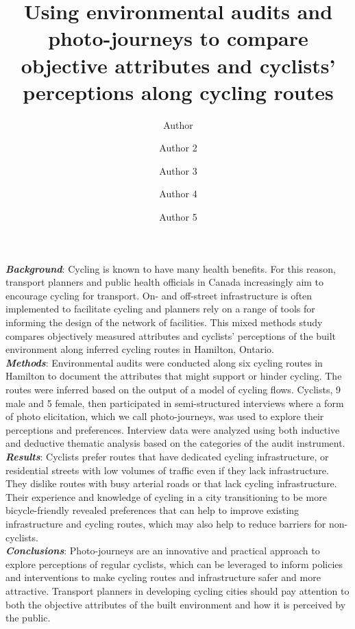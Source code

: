 \documentclass[]{elsarticle} %
\begin{document}
\begin{frontmatter}

  \title{Using environmental audits and photo-journeys to compare objective
attributes and cyclists' perceptions along cycling routes}
    \author[Some School]{Author}
    \author[Some Department]{Author 2}
    \author[Some School]{Author 3}
    \author[Another Department]{Author 4}
    \author[Some School]{Author 5}
      \address[Some School]{School of X}
    \address[Some Department]{Department of Y}
    \address[Another Department]{Department of Z}
    
  \begin{abstract}
  
  \end{abstract}
  
 \end{frontmatter}

\textbf{\emph{Background}}: Cycling is known to have many health
benefits. For this reason, transport planners and public health
officials in Canada increasingly aim to encourage cycling for transport.
On- and off-street infrastructure is often implemented to facilitate
cycling and planners rely on a range of tools for informing the design
of the network of facilities. This mixed methods study compares
objectively measured attributes and cyclists' perceptions of the built
environment along inferred cycling routes in Hamilton, Ontario.\\
\textbf{\emph{Methods}}: Environmental audits were conducted along six
cycling routes in Hamilton to document the attributes that might support
or hinder cycling. The routes were inferred based on the output of a
model of cycling flows. Cyclists, 9 male and 5 female, then participated
in semi-structured interviews where a form of photo elicitation, which
we call photo-journeys, was used to explore their perceptions and
preferences. Interview data were analyzed using both inductive and
deductive thematic analysis based on the categories of the audit
instrument.\\
\textbf{\emph{Results}}: Cyclists prefer routes that have dedicated
cycling infrastructure, or residential streets with low volumes of
traffic even if they lack infrastructure. They dislike routes with busy
arterial roads or that lack cycling infrastructure. Their experience and
knowledge of cycling in a city transitioning to be more bicycle-friendly
revealed preferences that can help to improve existing infrastructure
and cycling routes, which may also help to reduce barriers for
non-cyclists.\\
\textbf{\emph{Conclusions}}: Photo-journeys are an innovative and
practical approach to explore perceptions of regular cyclists, which can
be leveraged to inform policies and interventions to make cycling routes
and infrastructure safer and more attractive. Transport planners in
developing cycling cities should pay attention to both the objective
attributes of the built environment and how it is perceived by the
public.
\end{document}
